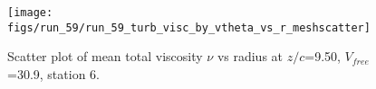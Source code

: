 \begin{figure}[H]
\centering
\texttt{[image: figs/run\_59/run\_59\_turb\_visc\_by\_vtheta\_vs\_r\_meshscatter]}
\caption{Scatter plot of mean total viscosity $\nu$ vs radius at $z/c$=9.50, $V_{free}$=30.9, station 6.}
\label{fig:run_59_turb_visc_by_vtheta_vs_r_meshscatter}
\end{figure}


